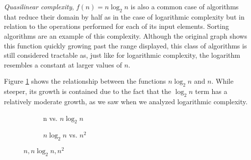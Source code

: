 \textit{Quasilinear complexity}, $f(n) = n \log_{2}n$ is also a common case of
algorithms that reduce their domain by half as in the case of logarithmic
complexity but in relation to the operations performed for each of its input
elements.  Sorting algorithms are an example of this complexity.  Although the
original graph shows this function quickly growing past the range displayed,
this class of algorithms is still considered tractable as, just like for
logarithmic complexity, the logarithm resembles a constant at larger values of
$n$.

Figure \ref{fig:algo:comp_n_nlog} shows the relationship between the functions
$n \log_{2}n$ and $n$.  While steeper, its growth is contained due to the fact
that the $\log_{2}n$ term has a relatively moderate growth, as we saw when we
analyzed logarithmic complexity.

\begin{figure}[ht]
    \centering
    \hfill
    \begin{subfigure}[h]{0.45\textwidth}
        \caption{n vs. $n \log_{2}n$}
        \label{fig:algo:comp_n_nlog}
    \end{subfigure}
    \hfill
    \begin{subfigure}[h]{0.45\textwidth}
        \caption{$n \log_{2}n$ vs. $n^2$}
        \label{fig:algo:comp_nlog_n2}
    \end{subfigure}
    \hfill
    \caption{$n, n \log_{2}n, n^2$}
    \label{fig:algo:comp_n_nlog_n2}
\end{figure}

